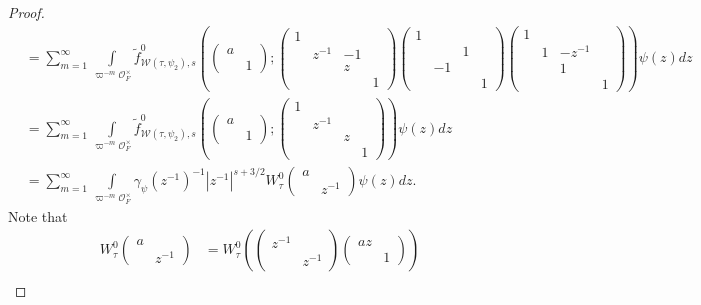 \documentclass[11pt]{amsart}
\theoremstyle{definition}
\theoremstyle{remark}
\begin{document}
\begin{proof}
\begin{equation*}
\begin{split}
 & = \sum_{m=1}^\infty  \int\limits_{ \varpi^{-m}  \mathcal{O}_F^\times}    \tilde{f}_{\mathcal{W}(\tau,\psi_2), s} ^0 \left( \left(\begin{smallmatrix} a & \\&1 \end{smallmatrix}\right);  \left(\begin{smallmatrix} 1 &&&\\&z^{-1}&-1&\\&&z&\\ &&&1\end{smallmatrix}\right)    \left(\begin{smallmatrix} 1 &&&\\&&1&\\&-1&&\\ &&&1\end{smallmatrix}\right)   \left(\begin{smallmatrix} 1 &&&\\&1&-z^{-1}&\\&&1&\\ &&&1\end{smallmatrix}\right)      \right)   \psi(z)dz \\
 & = \sum_{m=1}^\infty  \int\limits_{ \varpi^{-m}  \mathcal{O}_F^\times}    \tilde{f}_{\mathcal{W}(\tau,\psi_2), s} ^0  \left(\left(\begin{smallmatrix} a & \\&1 \end{smallmatrix}\right)  ; \left(\begin{smallmatrix} 1&&&\\&z^{-1}&&\\&&z&\\ &&&1\end{smallmatrix}\right)    \right)        \psi(z)dz \\
 &=   \sum_{m=1}^\infty  \int\limits_{ \varpi^{-m} \mathcal{O}_F^\times}   \gamma_\psi(z^{-1})^{-1} |z^{-1}|^{s+3/2} W_\tau^0  \left( \begin{smallmatrix} a & \\ & z^{-1} \end{smallmatrix}\right) \psi(z)dz.
\end{split}
\end{equation*}
Note that
\begin{equation*}
\begin{split}
W_\tau^0  \left( \begin{smallmatrix} a & \\ & z^{-1} \end{smallmatrix}\right) &=  W_\tau^0  \left(   \left( \begin{smallmatrix} z^{-1} & \\ & z^{-1} \end{smallmatrix}\right)  \left( \begin{smallmatrix} az & \\ & 1 \end{smallmatrix}\right)    \right) \\

\end{split}
\end{equation*}
\end{proof}
\end{document}
